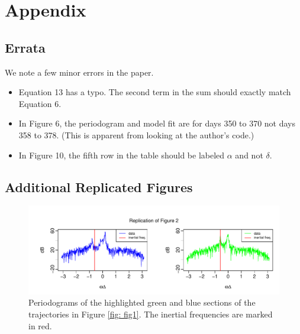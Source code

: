 \documentclass{stat572Style}
\begin{document}
\clearpage



\clearpage

\section{Appendix}

\subsection{Errata}
We note a few minor errors in the paper.
\begin{itemize}
\item Equation 13 has a typo. The second term in the sum should exactly match Equation 6. 
\item In Figure 6, the periodogram and model fit are for days 350 to 370 not days 358 to 378. (This is apparent from looking at the author's code.)
\item In Figure 10, the fifth row in the table should be labeled $\alpha$ and not $\delta$.
\end{itemize} 

\subsection{Additional Replicated Figures}

\begin{figure}[h!]
  \centering
    \includegraphics[width=\textwidth]{ReplicatedFigures/fig2.pdf}
        \caption{Periodograms of the highlighted green and blue sections of the trajectories in Figure \ref{fig: fig1}. The inertial frequencies are marked in red. }
        	\label{fig: fig2}
\end{figure}
\end{document}
